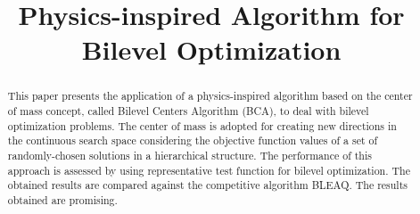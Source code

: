 \documentclass[conference]{IEEEtran}
\begin{document}
%
\title{Physics-inspired Algorithm for \\ Bilevel Optimization}


\author{
\and
}

\maketitle

\thispagestyle{firststyle}
\renewcommand{\headrulewidth}{0in}
\pagestyle{empty}


\pagestyle{fancy}



\begin{abstract}
This paper presents the application of a physics-inspired algorithm based on the 
center of mass concept, called Bilevel Centers Algorithm (BCA), to deal with 
bilevel optimization problems. The center of mass is adopted for creating new directions 
in the continuous search space considering the objective function values of a set 
of randomly-chosen solutions in a hierarchical structure. The performance of this
approach is assessed by using representative test function for bilevel optimization.
The obtained results are compared against the competitive algorithm BLEAQ.  The
results obtained are promising.
\end{abstract}
\end{document}
